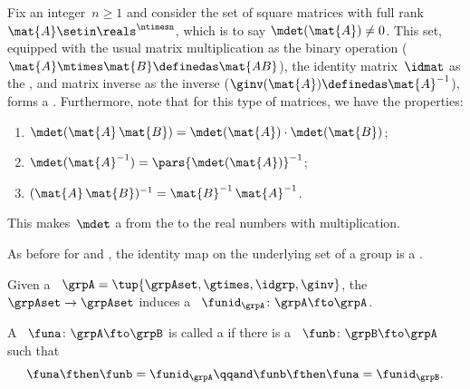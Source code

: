 \begin{example}
    \label{exa:square-full}
    Fix an integer~$n \geq 1$ and consider the set of square matrices with full rank~$\mat{A} \setin \reals^{\ntimesn}$, which is to say $\mdet(\mat{A}) \neq 0$.
    This set, equipped with the usual matrix multiplication as the binary operation ($\mat{A}\mtimes \mat{B}\definedas \mat{AB}$), the identity matrix~$\idmat$ as the , and matrix inverse as the inverse ($\ginv(\mat{A})\definedas \mat{A}^{-1}$), forms a .
    Furthermore, note that for this type of matrices, we have the properties:
    \begin{enumerate}
        \item $\mdet(\mat{A} \, \mat{B}) = \mdet(\mat{A}) \cdot \mdet(\mat{B})$;
        \item $\mdet(\mat{A}^{-1}) = \pars{ \mdet(\mat{A}) } ^ {-1}$;
        \item $(\mat{A}\,\mat{B})^{-1} = {\mat{B}^{-1} \, \mat{A}^{-1}}$.
    \end{enumerate}
    This makes~$\mdet$ a  from the  to the real numbers with multiplication.
\end{example}

As before for  and , the identity map on the underlying set of a group is a .

\begin{ctdefinition}
    \label{def:identity-grp-mor}
    Given a ~$\grpA = \tup{\grpAset, \gtimes, \idgrp, \ginv}$, the  $\grpAset \to \grpAset$ induces a ~$\funid_\grpA\colon \grpA \fto \grpA$.
\end{ctdefinition}

\begin{ctdefinition}
    \label{def:group-isomorphism}
    A ~$\funa\colon \grpA \fto \grpB$ is called a  if there is a ~$\funb\colon \grpB \fto \grpA$ such that
    \begin{equation}
        \funa \fthen \funb = \funid_\grpA \qqand \funb \fthen \funa = \funid_\grpB.
    \end{equation}
\end{ctdefinition}

